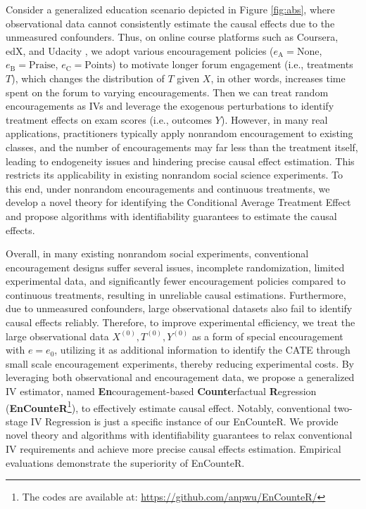 \documentclass[journal]{IEEEtran}
\begin{document}
Consider a generalized education scenario depicted in Figure \ref{fig:abs}, where observational data cannot consistently estimate the causal effects due to the unmeasured confounders. Thus, on online course platforms such as Coursera, edX, and Udacity \cite{breslow2013studying,reich2015rebooting,anderson2014engaging,kizilcec2014encouraging}, we adopt various encouragement policies (${e}_\text{A}=\text{None}$, ${e}_\text{B}=\text{Praise}$, ${e}_\text{C}=\text{Points}$) to motivate longer forum engagement (i.e., treatments $T$), which changes the distribution of $T$ given $X$, in other words, increases time spent on the forum to varying encouragements.
Then we can treat random encouragements as IVs and leverage the exogenous perturbations to identify treatment effects on exam scores (i.e., outcomes $Y$). 
However, in many real applications, practitioners typically apply nonrandom encouragement to existing classes, and the number of encouragements may far less than the treatment itself, leading to endogeneity issues and hindering precise causal effect estimation. This restricts its applicability in existing nonrandom social science experiments.
To this end, under nonrandom encouragements and continuous treatments, we develop a novel theory for identifying the Conditional Average Treatment Effect and propose algorithms with identifiability guarantees to estimate the causal effects.

Overall, in many existing nonrandom social experiments, conventional encouragement designs suffer several issues, 
incomplete randomization, limited experimental data, and significantly fewer encouragement policies compared to continuous treatments, resulting in unreliable causal estimations. Furthermore, due to unmeasured confounders, large observational datasets also fail to identify causal effects reliably. Therefore, to improve experimental efficiency, we treat the large observational data ${X^{(0)}, T^{(0)}, Y^{(0)}}$ as a form of special encouragement with ${e} = {e}_\text{0}$, utilizing it as additional information to identify the CATE through small scale encouragement experiments, thereby reducing experimental costs. By leveraging both observational and encouragement data, we propose a generalized IV estimator, named \textbf{En}couragement-based \textbf{Counte}rfactual \textbf{R}egression (\textbf{EnCounteR}\footnote{The codes are available at: \url{https://github.com/anpwu/EnCounteR/}}), to effectively estimate causal effect. Notably, conventional two-stage IV Regression is just a specific instance of our EnCounteR. We provide novel theory and algorithms with identifiability guarantees to relax conventional IV requirements and achieve more precise causal effects estimation. 
Empirical evaluations demonstrate the superiority of EnCounteR. 
\end{document}
